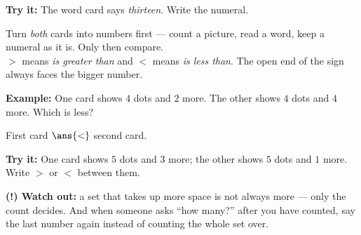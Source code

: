 \documentclass[12pt]{article}
\begin{document}
\begin{tryitbox}
\textbf{Try it:} The word card says \emph{thirteen}. Write the numeral.\\[2pt]
\end{tryitbox}


\begin{formulabox}
Turn \emph{both} cards into numbers first --- count a picture, read a word,
keep a numeral as it is. Only then compare.\\[3pt]
$>$ means \emph{is greater than} and $<$ means \emph{is less than}. The open
end of the sign always faces the bigger number.
\end{formulabox}

\begin{examplebox}
\textbf{Example:} One card shows $4$ dots and $2$ more. The other shows $4$
dots and $4$ more. Which is less?

First card $\ans{<}$ second card.
\end{examplebox}

\begin{tryitbox}
\textbf{Try it:} One card shows $5$ dots and $3$ more; the other shows $5$ dots
and $1$ more. Write $>$ or $<$ between them.\\[2pt]
\end{tryitbox}

\begin{watchoutbox}
\textbf{(!) Watch out:} a set that takes up more space is not always more ---
only the count decides. And when someone asks ``how many?'' after you have
counted, say the last number again instead of counting the whole set over.
\end{watchoutbox}
\end{document}
